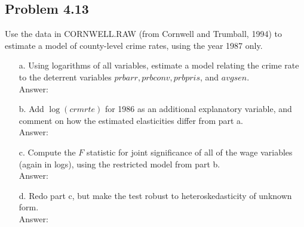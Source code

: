 \documentclass[10pt]{article}
\begin{document}
\subsection*{Problem 4.13}
Use the data in CORNWELL.RAW (from Cornwell and Trumball, 1994) to estimate a model of county-level crime rates, using the year 1987 only.
\begin{enumerate}
\item[a.] Using logarithms of all variables, estimate a model relating the crime rate to the deterrent variables $prbarr, prbconv, prbpris$, and $avgsen.$
\\ Answer:\\


\item[b.] Add $\log(crmrte)$ for 1986 as an additional explanatory variable, and comment on how the estimated elasticities differ from part a.
\\ Answer:\\


\item[c.] Compute the $F$ statistic for joint significance of all of the wage variables (again in logs), using the restricted model from part b.
\\ Answer:\\


\item[d.] Redo part c, but make the test robust to heteroskedasticity of unknown form.
\\ Answer:\\
\end{enumerate}
\end{document}

